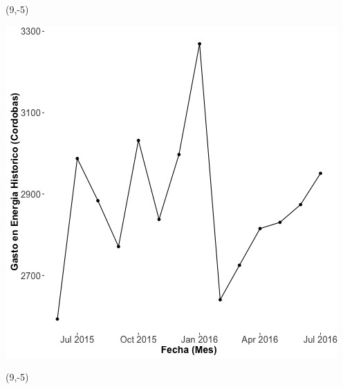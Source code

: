 \documentclass{article}\usepackage[]{graphicx}\usepackage[]{color}
\newenvironment{knitrout}{}{} %
\begin{document}
 \begin{textblock}{1}(9,-5)
\begin{minipage}{20em}
\begingroup

\endgroup
\end{minipage}
\end{textblock}

\begin{knitrout}
\color{fgcolor}
\includegraphics[scale=0.65]{figure/A24_historico_cordobas} 
\end{knitrout}

 \begin{textblock}{1}(9,-5)
\begin{minipage}{20em}
\begingroup

\endgroup
\end{minipage}
\end{textblock}
\end{document}

